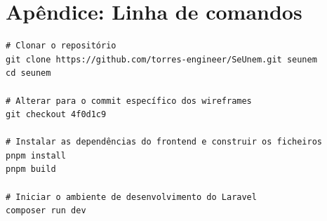 \documentclass[12pt,a4paper,openright,oneside]{memoir}
\begin{document}
\chapter{Apêndice: Linha de comandos}
\label{app:clone_wireframes}
\begin{verbatim}
# Clonar o repositório
git clone https://github.com/torres-engineer/SeUnem.git seunem
cd seunem

# Alterar para o commit específico dos wireframes
git checkout 4f0d1c9

# Instalar as dependências do frontend e construir os ficheiros
pnpm install
pnpm build

# Iniciar o ambiente de desenvolvimento do Laravel
composer run dev
\end{verbatim}

\backmatter
\end{document}
